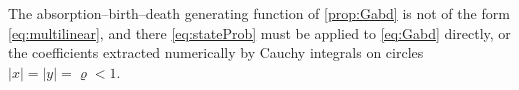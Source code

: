 The absorption--birth--death generating function of \cref{prop:Gabd} is not of the
form \cref{eq:multilinear}, and there \cref{eq:stateProb} must be applied to
\cref{eq:Gabd} directly, or the coefficients extracted numerically by Cauchy
integrals on circles $|x|=|y|=\varrho<1$.

\renewcommand{\thesection}{\thechapter.\arabic{section}}

